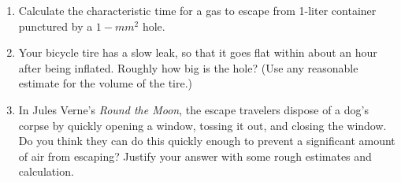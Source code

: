 \documentclass[fleqn]{article}
\begin{document}
\begin{enumerate}
\begin{enumerate}

        \item Calculate the characteristic time for a gas to escape from 1-liter container punctured by a $1-mm^2$ hole.
        

        \item Your bicycle tire has a slow leak, so that it goes flat within about an hour after being inflated. Roughly how big is the 
        hole? (Use any reasonable estimate for the volume of the tire.)


        \item In Jules Verne's \emph{Round the Moon}, the escape travelers dispose of a dog's corpse by quickly opening a window,
        tossing it out, and closing the window. Do you think they can do this quickly enough to prevent a significant amount of air
        from escaping? Justify your answer with some rough estimates and calculation.


      \end{enumerate}

  \end{enumerate}
\end{document}

